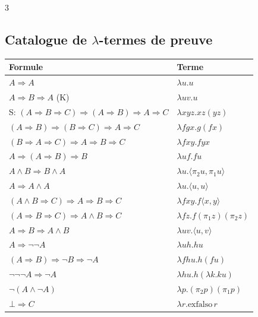 \documentclass[12pt, a4paper]{article}
\begin{document}
\begin{multicols*}{3}
	\colbreak
	\subsection{Catalogue de $\lambda$-termes de preuve}
	\begin{tabular}{|l|l|}
		\hline
		\textbf{Formule}                                        & \textbf{Terme}                                     \\
		\hline
		$A\Rightarrow A$                                        & $\lambda u.u$                                      \\
		$A\Rightarrow B\Rightarrow A$ (K)                       & $\lambda uv.u$                                     \\
		S: $(A{\Rightarrow}B{\Rightarrow}C){\Rightarrow}(A{\Rightarrow}B){\Rightarrow}A{\Rightarrow}C$ & $\lambda xyz.xz(yz)$ \\
		$(A\Rightarrow B)\Rightarrow(B\Rightarrow C)\Rightarrow A\Rightarrow C$ & $\lambda fgx.g(fx)$         \\
		$(B\Rightarrow A\Rightarrow C)\Rightarrow A\Rightarrow B\Rightarrow C$ & $\lambda fxy.fyx$           \\
		$A\Rightarrow(A\Rightarrow B)\Rightarrow B$             & $\lambda uf.fu$                                    \\
		$A\wedge B\Rightarrow B\wedge A$                        & $\lambda u.\langle\pi_2u,\pi_1u\rangle$            \\
		$A\Rightarrow A\wedge A$                                & $\lambda u.\langle u,u\rangle$                     \\
		$(A\wedge B\Rightarrow C)\Rightarrow A\Rightarrow B\Rightarrow C$ & $\lambda fxy.f\langle x,y\rangle$ \\
		$(A\Rightarrow B\Rightarrow C)\Rightarrow A\wedge B\Rightarrow C$ & $\lambda fz.f(\pi_1z)(\pi_2z)$   \\
		$A\Rightarrow B\Rightarrow A\wedge B$                   & $\lambda uv.\langle u,v\rangle$                    \\
		$A\Rightarrow\neg\neg A$                                & $\lambda uh.hu$                                    \\
		$(A\Rightarrow B)\Rightarrow\neg B\Rightarrow\neg A$    & $\lambda fhu.h(fu)$                                \\
		$\neg\neg\neg A\Rightarrow\neg A$                       & $\lambda hu.h(\lambda k.ku)$                       \\
		$\neg(A\wedge\neg A)$                                   & $\lambda p.(\pi_2p)(\pi_1p)$                       \\
		$\bot\Rightarrow C$                                     & $\lambda r.\text{exfalso}\,r$                      \\
		\hline
	\end{tabular}


\end{multicols*}
\end{document}
